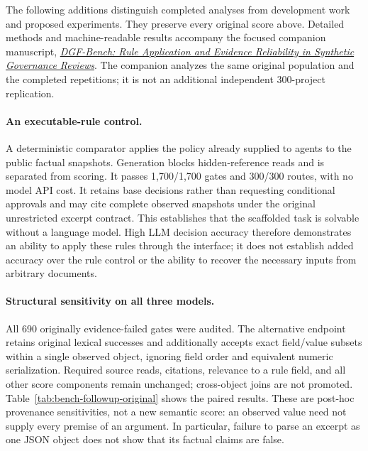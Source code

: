 The following additions distinguish completed analyses from development work and proposed
experiments. They preserve every original score above. Detailed methods and machine-readable
results accompany the focused companion manuscript,
\href{https://github.com/jeremy1392/dgf-agentic-bench/blob/main/paper2/From_Governance_Reviews_to_Task_Substitution.pdf}{\emph{DGF-Bench: Rule Application and Evidence Reliability in Synthetic Governance Reviews}}.
The companion analyzes the same original population and the completed repetitions; it is not
an additional independent 300-project replication.

\paragraph{An executable-rule control.}
A deterministic comparator applies the policy already supplied to agents to the public factual
snapshots. Generation blocks hidden-reference reads and is separated from scoring. It passes
1,700/1,700 gates and 300/300 routes, with no model API cost. It retains base decisions rather
than requesting conditional approvals and may cite complete observed snapshots under the
original unrestricted excerpt contract. This establishes that the scaffolded task is solvable
without a language model. High LLM decision accuracy therefore demonstrates an ability to
apply these rules through the interface; it does not establish added accuracy over the rule
control or the ability to recover the necessary inputs from arbitrary documents.

\paragraph{Structural sensitivity on all three models.}
All 690 originally evidence-failed gates were audited. The alternative endpoint retains
original lexical successes and additionally accepts exact field/value subsets within a single
observed object, ignoring field order and equivalent numeric serialization. Required source
reads, citations, relevance to a rule field, and all other score components remain unchanged;
cross-object joins are not promoted. Table~\ref{tab:bench-followup-original} shows the paired
results. These are post-hoc provenance sensitivities, not a new semantic score: an observed
value need not supply every premise of an argument. In particular, failure to parse an
excerpt as one JSON object does not show that its factual claims are false.

